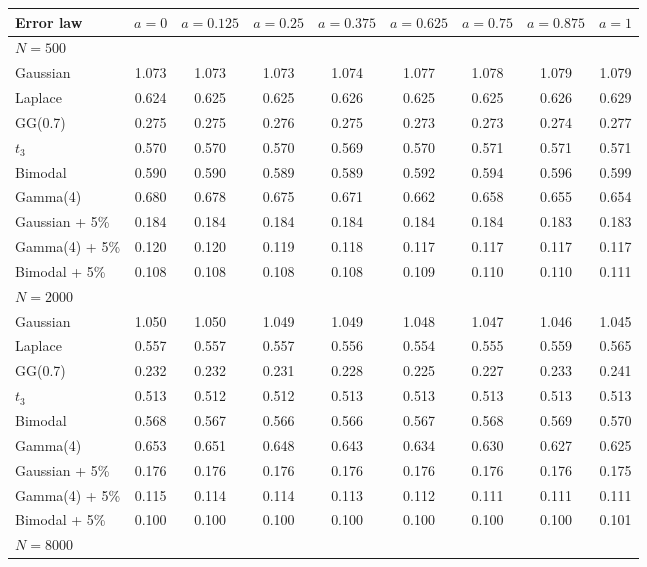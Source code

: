 \begin{tabular}{lcccccccc}
\toprule
Error law & $a=0$ & $a=0.125$ & $a=0.25$ & $a=0.375$ & $a=0.625$ & $a=0.75$ & $a=0.875$ & $a=1$ \\
\midrule
\multicolumn{9}{l}{\emph{$N=500$}} \\
Gaussian & 1.073 & 1.073 & 1.073 & 1.074 & 1.077 & 1.078 & 1.079 & 1.079 \\
Laplace & 0.624 & 0.625 & 0.625 & 0.626 & 0.625 & 0.625 & 0.626 & 0.629 \\
GG(0.7) & 0.275 & 0.275 & 0.276 & 0.275 & 0.273 & 0.273 & 0.274 & 0.277 \\
$t_3$ & 0.570 & 0.570 & 0.570 & 0.569 & 0.570 & 0.571 & 0.571 & 0.571 \\
Bimodal & 0.590 & 0.590 & 0.589 & 0.589 & 0.592 & 0.594 & 0.596 & 0.599 \\
Gamma(4) & 0.680 & 0.678 & 0.675 & 0.671 & 0.662 & 0.658 & 0.655 & 0.654 \\
Gaussian + 5\% & 0.184 & 0.184 & 0.184 & 0.184 & 0.184 & 0.184 & 0.183 & 0.183 \\
Gamma(4) + 5\% & 0.120 & 0.120 & 0.119 & 0.118 & 0.117 & 0.117 & 0.117 & 0.117 \\
Bimodal + 5\% & 0.108 & 0.108 & 0.108 & 0.108 & 0.109 & 0.110 & 0.110 & 0.111 \\
\multicolumn{9}{l}{\emph{$N=2000$}} \\
Gaussian & 1.050 & 1.050 & 1.049 & 1.049 & 1.048 & 1.047 & 1.046 & 1.045 \\
Laplace & 0.557 & 0.557 & 0.557 & 0.556 & 0.554 & 0.555 & 0.559 & 0.565 \\
GG(0.7) & 0.232 & 0.232 & 0.231 & 0.228 & 0.225 & 0.227 & 0.233 & 0.241 \\
$t_3$ & 0.513 & 0.512 & 0.512 & 0.513 & 0.513 & 0.513 & 0.513 & 0.513 \\
Bimodal & 0.568 & 0.567 & 0.566 & 0.566 & 0.567 & 0.568 & 0.569 & 0.570 \\
Gamma(4) & 0.653 & 0.651 & 0.648 & 0.643 & 0.634 & 0.630 & 0.627 & 0.625 \\
Gaussian + 5\% & 0.176 & 0.176 & 0.176 & 0.176 & 0.176 & 0.176 & 0.176 & 0.175 \\
Gamma(4) + 5\% & 0.115 & 0.114 & 0.114 & 0.113 & 0.112 & 0.111 & 0.111 & 0.111 \\
Bimodal + 5\% & 0.100 & 0.100 & 0.100 & 0.100 & 0.100 & 0.100 & 0.100 & 0.101 \\
\multicolumn{9}{l}{\emph{$N=8000$}} \\

\end{tabular}
